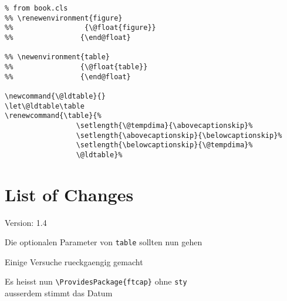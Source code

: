 \documentclass[german, american, parskip=half, pagesize=auto]{scrartcl}
\newcommand*{\env}[1]{\texttt{#1}}
\begin{document}
\begin{lstlisting}
% from book.cls
%% \renewenvironment{figure}
%%                 {\@float{figure}}
%%                {\end@float}

%% \newenvironment{table}
%%                {\@float{table}}
%%                {\end@float}

\newcommand{\@ldtable}{}
\let\@ldtable\table
\renewcommand{\table}{%
                 \setlength{\@tempdima}{\abovecaptionskip}%
                 \setlength{\abovecaptionskip}{\belowcaptionskip}%
                 \setlength{\belowcaptionskip}{\@tempdima}%
                 \@ldtable}%
\end{lstlisting}


\section*{List of Changes}

\begin{otherlanguage}{german}
  \begin{labeling}[\hspace{\labelsep}--]{Version: 1.4}
  \item[Version: 1.4] Die optionalen Parameter von \env{table} sollten nun gehen
  \item[Version: 1.3] Einige Versuche rueckgaengig gemacht
  \item[Version: 1.2] Es heisst nun \verb|\ProvidesPackage{ftcap}| ohne \verb|sty|\\
    ausserdem stimmt das Datum
  \item[Version: 1.1]
  \end{labeling}
\end{otherlanguage}
\end{document}
